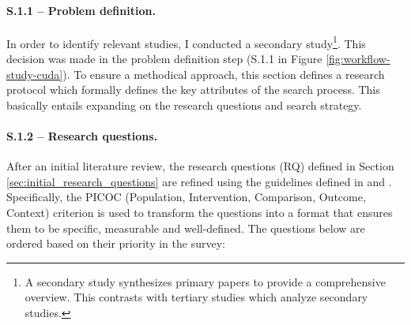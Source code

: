 \paragraph{S.1.1 -- Problem definition.}
In order to identify relevant studies, I conducted a secondary study\footnote{A secondary study
	synthesizes primary papers to provide a comprehensive overview. This contrasts with tertiary
	studies which analyze secondary studies.}. This decision was made in the problem definition step
(S.1.1 in Figure \ref{fig:workflow-study-cuda}). To ensure a methodical approach, this section
defines a research protocol which formally defines the key attributes of the search process. This
basically entails expanding on the research questions and search strategy.

\paragraph{S.1.2 -- Research questions.}
After an initial literature review, the research questions (RQ) defined in Section
\ref{sec:initial_research_questions} are refined using the guidelines defined in
\cite{kitchenham_evidence-based_2015} and \cite{keele_systematic_2007}. Specifically, the PICOC
(Population, Intervention, Comparison, Outcome, Context) criterion is used to transform the
questions into a format that ensures them to be specific, measurable and well-defined. The
questions below are ordered based on their priority in the survey:


